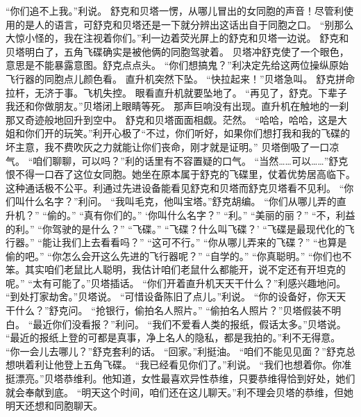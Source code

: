 \documentclass[a4paper,12pt,UTF8,twoside]{ctexbook}
\begin{document}
        “你们追不上我。”利说。 
        舒克和贝塔一愣，从哪儿冒出的女同胞的声音！尽管利使用的是人的语言，可舒克和贝塔还是一下就分辨出这话出自于同胞之口。 
        “别那么大惊小怪的，我在注视着你们。”利一边着荧光屏上的舒克和贝塔一边说。 
        舒克和贝塔明白了，五角飞碟确实是被他俩的同胞驾驶着。 
        贝塔冲舒克使了一个眼色，意思是不能暴露意图。舒克点点头。 
        “你们想搞鬼？”利决定先给这两位操纵原始飞行器的同胞点儿颜色看。 
        直升机突然下坠。 
        “快拉起来！”贝塔急叫。 
        舒克拼命拉杆，无济于事。飞机失控。 
        眼看直升机就要坠地了。 
        “再见了，舒克。下辈子我还和你做朋友。”贝塔闭上眼睛等死。 
        那声巨响没有出现。直升机在触地的一刹那又奇迹般地回升到空中。 
        舒克和贝塔面面相觑。茫然。 
        “哈哈，哈哈，这是大姐和你们开的玩笑。”利开心极了“不过，你们听好，如果你们想打我和我的飞碟的坏主意，我不费吹灰之力就能让你们丧命，刚才就是证明。” 
        贝塔倒吸了一口凉气。 
        “咱们聊聊，可以吗？”利的话里有不容置疑的口气。 
        “当然……可以……”舒克恨不得一口吞了这位女同胞。她坐在原本属于舒克的飞碟里，仗着优势居高临下。 
        这种通话极不公平。利通过先进设备能看见舒克和贝塔而舒克贝塔看不见利。 
        “你们叫什么名字？”利问。 
        “我叫毛克，他叫宝塔。”舒克胡编。 
        “你们从哪儿弄的直升机？” 
        “偷的。” 
        “真有你们的。” 
        ‘你叫什么名字？” 
        “利。” 
        “美丽的丽？” 
        “不，利益的利。” 
        “你驾驶的是什么？” 
        “飞碟。” 
        “飞碟？什么叫飞碟？’ 
        “飞碟是最现代化的飞行器。” 
        “能让我们上去看看吗？” 
        “这可不行。” 
        “你从哪儿弄来的飞碟？” 
        “也算是偷的吧。” 
        “你怎么会开这么先进的飞行器呢？” 
        “自学的。” 
        “你真聪明。” 
        “你们也不笨。其实咱们老鼠比人聪明，我估计咱们老鼠什么都能开，说不定还有开坦克的呢。” 
        “太有可能了。”贝塔插话。 
        “你们开着直升机天天干什么？”利感兴趣地问。 
        “到处打家劫舍。”贝塔说。 
        “可惜设备陈旧了点儿。”利说。 
        “你的设备好，你天天干什么？”舒克问。 
        “抢银行，偷拍名人照片。” 
        “偷拍名人照片？”贝塔假装不明白。 
        “最近你们没看报？”利问。 
        “我们不爱看人类的报纸，假话太多。”贝塔说。 
        “最近的报纸上登的可都是真事，净上名人的隐私，都是我拍的。”利不无得意。 
        “你一会儿去哪儿？”舒克套利的话。 
        “回家。”利挺油。 
        “咱们不能见见面？”舒克总想哄着利让他登上五角飞碟。 
        “我已经看见你们了。”利说。 
        “我们也想着你。你准挺漂亮。”贝塔恭维利。他知道，女性最喜欢异性恭维，只要恭维得恰到好处，她们就会奉献到底。 
        “明天这个时间，咱们还在这儿聊天。”利不理会贝塔的恭维，但她明天还想和同胞聊天。 
\end{document}
